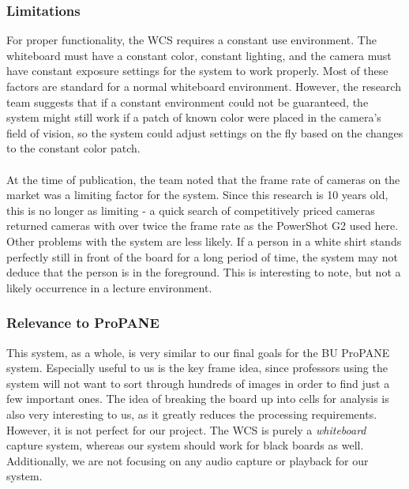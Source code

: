\documentclass{article}
\begin{document}
	\subsubsection*{Limitations}
For proper functionality, the WCS requires a constant use environment.  The whiteboard must have a constant color, constant lighting, and the camera must have constant exposure settings for the system to work properly.  Most of these factors are standard for a normal whiteboard environment.  However, the research team suggests that if a constant environment could not be guaranteed, the system might still work if a patch of known color were placed in the camera's field of vision, so the system could adjust settings on the fly based on the changes to the constant color patch. \\  \\
	\indent At the time of publication, the team noted that the frame rate of cameras on the market was a limiting factor for the system.  Since this research is 10 years old, this is no longer as limiting - a quick search of competitively priced cameras returned cameras with over twice the frame rate as the PowerShot G2 used here.
Other problems with the system are less likely.  If a person in a white shirt stands perfectly still in front of the board for a long period of time, the system may not deduce that the person is in the foreground.  This is interesting to note, but not a likely occurrence in a lecture environment.    
	
	\subsubsection*{Relevance to ProPANE}
This system, as a whole, is very similar to our final goals for the BU ProPANE system.  Especially useful to us is the key frame idea, since professors using the system will not want to sort through hundreds of images in order to find just a few important ones.  The idea of breaking the board up into cells for analysis is also very interesting to us, as it greatly reduces the processing requirements.  However, it is not perfect for our project.  The WCS is purely a {\sl whiteboard} capture system, whereas our system should work for black boards as well.  Additionally, we are not focusing on any audio capture or playback for our system.
\end{document}
